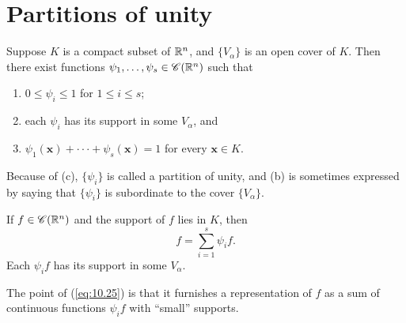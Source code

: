 
\section{Partitions of unity}

\begin{thm}
    \label{thm:10.8}
    Suppose $K$ is a compact subset of ${\protect\mathbb R}^n$, 
    and $\{V_{\alpha}\}$ is an open cover of $K$. 
    Then there exist functions $\psi_1, \dots, \psi_s \in \mathscr{C}({\protect\mathbb R}^n)$ 
    such that
    \begin{enumerate}
        \item $0 \leq \psi_i \leq 1$ for $1 \leq i \leq s$;
        \item each $\psi_i$ has its support in some $V_{\alpha}$, and
        \item $\psi_1 (\mathbf{x}) + · · · + \psi_s(\mathbf{x}) = 1$ for every $\mathbf{x} \in K$.
    \end{enumerate}
\end{thm}

Because of (c), $\{\psi_i\}$ is called a partition of unity, 
and (b) is sometimes expressed by saying that $\{\psi_i\}$ is subordinate to the cover $\{V_{\alpha}\}$.

\begin{myCorollary*}
    If $f \in \mathscr{C}({\protect\mathbb R}^n)$ and the support of $f$ lies in $K$, then
    \begin{equation}
        \label{eq:10.25}
        f = \sum_{i=1}^{s} \psi_i f .
    \end{equation}
    Each $\psi_i f$ has its support in some $V_{\alpha}$.
\end{myCorollary*}

The point of (\ref{eq:10.25}) is that it furnishes a representation of $f$ as a sum of continuous functions $\psi_i f$ with ``small'' supports.


